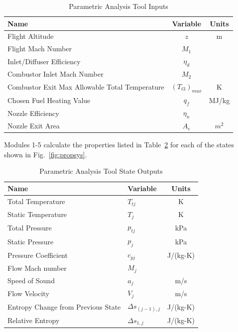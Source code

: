 \documentclass[conf]{new-aiaa} %
\begin{document}
\begin{table}[hbt!] %
    \caption{\label{tab:tool_inputs} Parametric Analysis Tool Inputs}
    \centering
    \begin{tabular}{lcc}
        \hline
        Name& Variable& Units\\\hline
        Flight Altitude& $z$& m\\
        Flight Mach Number& $M_1$\\
        Inlet/Diffuser Efficiency& $\eta_d$\\
        Combustor Inlet Mach Number& $M_2$\\
        Combustor Exit Max Allowable Total Temperature& $(T_{t3})_{max}$& K\\
        Chosen Fuel Heating Value& $q_f$& MJ/kg\\
        Nozzle Efficiency& $\eta_n$\\
        Nozzle Exit Area& $A_e$& $m^2$\\
        \hline
    \end{tabular}
\end{table}

Modules 1-5 calculate the properties listed in Table~\ref{tab:state_outputs} for each of the states shown in Fig.~\ref{fig:propsys}.

\begin{table}[hbt!] %
    \caption{\label{tab:state_outputs} Parametric Analysis Tool State Outputs}
    \centering
    \begin{tabular}{llc}
        \hline
        Name& Variable& Units\\\hline
        Total Temperature& $T_{tj}$& K\\
        Static Temperature& $T_{j}$& K\\
        Total Pressure& $p_{tj}$& kPa\\
        Static Pressure& $p_j$& kPa\\
        Pressure Coefficient& $c_{pj}$& J/(kg-K)\\
        Flow Mach number& $M_j$\\
        Speed of Sound& $a_j$& m/s\\
        Flow Velocity& $V_j$& m/s\\
        Entropy Change from Previous State& $\Delta s_{(j-1),j}$& J/(kg-K)\\
        Relative Entropy& $\Delta s_{1,j}$& J/(kg-K)\\
        \hline
    \end{tabular}
\end{table}
\end{document}
